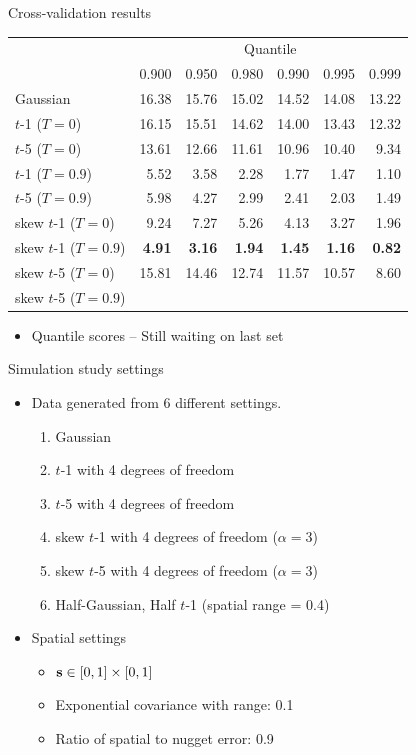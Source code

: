 \documentclass{beamer}
\begin{document}
\begin{frame}{Cross-validation results}
  \begin{table}[htbp]
    \small
    \centering
    \begin{tabular}{lrrrrrr}
           & \multicolumn{6}{c}{Quantile}\\
           \cline{2-7}
    & 0.900 & 0.950 & 0.980 & 0.990 & 0.995 & 0.999\\
  \hline
Gaussian & 16.38 & 15.76 & 15.02 & 14.52 & 14.08 & 13.22\\
$t$-1 ($T=0$) & 16.15 & 15.51 & 14.62 & 14.00 & 13.43 & 12.32\\
$t$-5 ($T=0$) & 13.61 & 12.66 & 11.61 & 10.96 & 10.40 & 9.34\\
$t$-1 ($T=0.9$) & 5.52  & 3.58  & 2.28  & 1.77  & 1.47  & 1.10\\
$t$-5 ($T=0.9$) & 5.98  & 4.27  & 2.99  & 2.41  & 2.03  & 1.49\\
skew $t$-1 ($T=0$) & 9.24  & 7.27  & 5.26  & 4.13  & 3.27  & 1.96\\
skew $t$-1 ($T=0.9$) & {\bf 4.91}  & {\bf 3.16} & {\bf 1.94}  & {\bf 1.45}  & {\bf 1.16}  & {\bf 0.82}\\
skew $t$-5 ($T=0$) & 15.81 & 14.46 & 12.74 & 11.57 & 10.57 & 8.60\\
skew $t$-5 ($T=0.9$) & & & & & &\\
\hline
    \end{tabular}
  \end{table}
  \begin{itemize} \setlength{\itemsep}{0.5em}
    \item Quantile scores -- Still waiting on last set
  \end{itemize}
\end{frame}

\begin{frame}{Simulation study settings}
  \begin{itemize} \setlength{\itemsep}{0.5em}
    \item Data generated from 6 different settings.
    \begin{enumerate}[1.]
      \item Gaussian
      \item $t$-1 with 4 degrees of freedom
      \item $t$-5 with 4 degrees of freedom
      \item skew $t$-1 with 4 degrees of freedom ($\alpha = 3$)
      \item skew $t$-5 with 4 degrees of freedom ($\alpha = 3$)
      \item Half-Gaussian, Half $t$-1 (spatial range = 0.4)
    \end{enumerate}
    \item Spatial settings
    \begin{itemize}
      \item $\mbox{\bf s} \in [0, 1] \times [0, 1]$
      \item Exponential covariance with range: 0.1
      \item Ratio of spatial to nugget error: 0.9
    \end{itemize}
  \end{itemize}
\end{frame}
\end{document}
